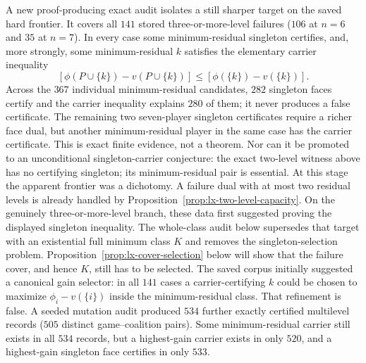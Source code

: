 A new proof-producing exact audit isolates a still sharper target on the saved
hard frontier.  It covers all $141$ stored three-or-more-level failures
($106$ at $n=6$ and $35$ at $n=7$). In every case some minimum-residual
singleton certifies, and, more strongly, some minimum-residual $k$ satisfies
the elementary carrier inequality
\[
 [\phi(P\cup\{k\})-v(P\cup\{k\})]
 \leq [\phi(\{k\})-v(\{k\})].
\]
Across the $367$ individual minimum-residual candidates, $282$ singleton
faces certify and the carrier inequality explains $280$ of them; it never
produces a false certificate.  The remaining two seven-player singleton
certificates require a richer face dual, but another minimum-residual player
in the same case has the carrier certificate.  This is exact finite evidence,
not a theorem.  Nor can it be promoted to an unconditional singleton-carrier
conjecture: the exact two-level witness above has no certifying singleton; its
minimum-residual pair is essential.  At this stage the apparent frontier was a dichotomy.
A failure dual with at most two residual levels is already handled by
Proposition~\ref{prop:lx-two-level-capacity}.  On the genuinely
three-or-more-level branch, these data first suggested proving the displayed
singleton inequality.  The whole-class audit below supersedes that target with
an existential full minimum class $K$ and removes the singleton-selection
problem.  Proposition~\ref{prop:lx-cover-selection} below will show that the
failure cover, and hence $K$, still has to be selected.
The saved corpus initially suggested a canonical gain selector: in all $141$
cases a carrier-certifying $k$ could be chosen to maximize
$\phi_i-v(\{i\})$ inside the minimum-residual class.  That refinement is
false.  A seeded mutation audit produced $534$ further exactly certified
multilevel records ($505$ distinct game--coalition pairs).  Some
minimum-residual carrier still exists in all $534$ records, but a
highest-gain carrier exists in only $520$, and a highest-gain
singleton face certifies in only $533$.

